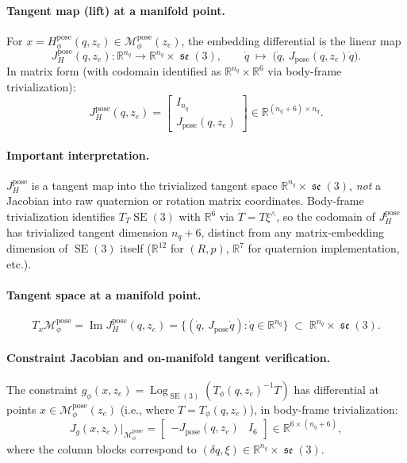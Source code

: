 \documentclass[11pt,a4paper]{article}
\DeclareMathOperator{\Log}{Log}
\DeclareMathOperator{\Image}{Im}
\DeclareMathOperator{\SE}{SE}
\DeclareMathOperator{\se}{\mathfrak{se}}
\newcommand{\R}{\mathbb{R}}
\newcommand{\Mpose}{\mathcal{M}_\phi^{\text{pose}}}
\newcommand{\Tphi}{T_\phi}
\newcommand{\Hpose}{H_\phi^{\text{pose}}}
\newcommand{\Jpose}{J_{\text{pose}}}
\begin{document}
\paragraph{Tangent map (lift) at a manifold point.} For $x = \Hpose(q, z_e) \in \Mpose(z_e)$, the embedding differential is the linear map
\begin{equation}
J_H^{\text{pose}}(q, z_e) : \R^{n_q} \longrightarrow \R^{n_q} \times \se(3), \qquad \dot q \;\longmapsto\; \bigl(\dot q, \, \Jpose(q, z_e) \dot q\bigr).
\end{equation}
In matrix form (with codomain identified as $\R^{n_q} \times \R^6$ via body-frame trivialization):
\begin{equation}
J_H^{\text{pose}}(q, z_e) = \begin{bmatrix} I_{n_q} \\ \Jpose(q, z_e) \end{bmatrix} \in \R^{(n_q + 6) \times n_q}.
\end{equation}

\paragraph{Important interpretation.} $J_H^{\text{pose}}$ is a tangent map into the trivialized tangent space $\R^{n_q} \times \se(3)$, \emph{not} a Jacobian into raw quaternion or rotation matrix coordinates. Body-frame trivialization identifies $T_T \SE(3)$ with $\R^6$ via $\dot T = T \xi^\wedge$, so the codomain of $J_H^{\text{pose}}$ has trivialized tangent dimension $n_q + 6$, distinct from any matrix-embedding dimension of $\SE(3)$ itself ($\R^{12}$ for $(R, p)$, $\R^7$ for quaternion implementation, etc.).

\paragraph{Tangent space at a manifold point.}
\begin{equation}
T_x \Mpose = \Image J_H^{\text{pose}}(q, z_e) = \bigl\{ (\dot q, \, \Jpose \dot q) : \dot q \in \R^{n_q} \bigr\} \;\subset\; \R^{n_q} \times \se(3).
\end{equation}

\paragraph{Constraint Jacobian and on-manifold tangent verification.} The constraint $g_\phi(x, z_e) = \Log_{\SE(3)}(\Tphi(q, z_e)^{-1} T)$ has differential at points $x \in \Mpose(z_e)$ (i.e., where $T = \Tphi(q, z_e)$), in body-frame trivialization:
\begin{equation}
J_g(x, z_e) \big|_{\Mpose} = \begin{bmatrix} -\Jpose(q, z_e) & I_6 \end{bmatrix} \in \R^{6 \times (n_q + 6)},
\end{equation}
where the column blocks correspond to $(\delta q, \xi) \in \R^{n_q} \times \se(3)$.
\end{document}
